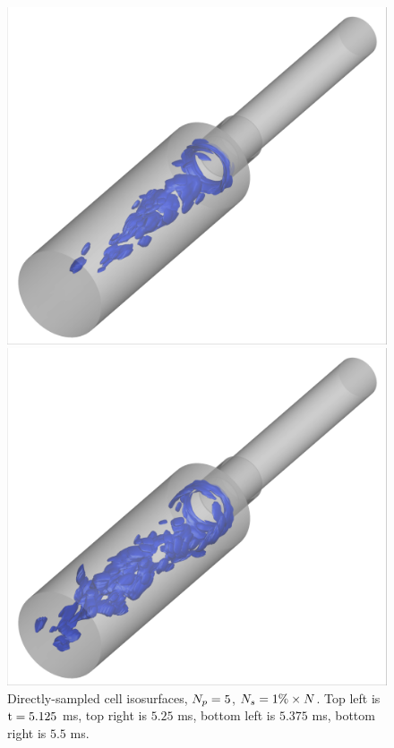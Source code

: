 \begin{figure}
	\centering
	\begin{minipage}{0.45\linewidth}
		\includegraphics[width=0.99\linewidth,trim={0.5em 0.5em 0.5em 0.5em},clip]{Chapters/AdaptiveResults/Images/cvrc/iblank/iblank_iso_1075.png}
	\end{minipage}
	\begin{minipage}{0.45\linewidth}
		\includegraphics[width=0.99\linewidth,trim={0.5em 0.5em 0.5em 0.5em},clip]{Chapters/AdaptiveResults/Images/cvrc/iblank/iblank_iso_1100.png}
	\end{minipage}
	\caption{\label{fig:cvrcAdaptiveIBlankIso}Directly-sampled cell isosurfaces, $N_p = 5$, $N_s = 1\% \times N$. Top left is $\text{t} = 5.125$ ms, top right is $5.25$ ms, bottom left is $5.375$ ms, bottom right is $5.5$ ms.}
\end{figure}

